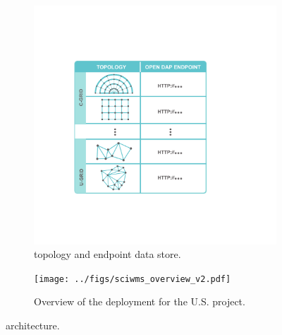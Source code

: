 
\begin{figure}
  \centering
  \begin{subfigure}[b]{0.455\textwidth}
    \includegraphics[width=\textwidth]{../figs/sciwms_book_db_topology_endpoints.pdf}
    \caption{\Sciwms{} topology and endpoint data store.}
    \label{fig:sciwms_topology_endpoints}
  \end{subfigure}
  \begin{subfigure}[b]{0.45\textwidth}
    \texttt{[image: ../figs/sciwms\_overview\_v2.pdf]}
    \caption{Overview of the \sciwms{} deployment for the U.S. \ioos{}
      \comt{} project.}
    \label{fig:overview1}
  \end{subfigure}
  \caption{\sciwms{} architecture.}
  \label{fig:architecture}
\end{figure}


